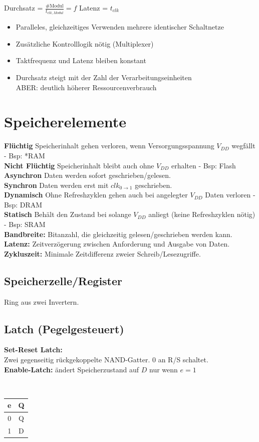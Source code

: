 \documentclass[6pt,a4paper]{scrartcl}
\renewcommand{\emph}[1]{\textsf{\textbf{#1}}}
\newcommand{\ra}[0]{\ensuremath{\rightarrow}} 									%
\begin{document}
\begin{multicols*}{3}
	Durchsatz = $\frac{\#\text{Modul}}{t_{clk,Modul}} = f$ \qquad \quad Latenz = $t_{clk}$
	\begin{itemize} \itemsep0pt
		\item Paralleles, gleichzeitiges Verwenden mehrere identischer Schaltnetze
		\item Zusätzliche Kontrolllogik nötig (Multiplexer)
		\item Taktfrequenz und Latenz bleiben konstant
		\item Durchsatz steigt mit der Zahl der Verarbeitungseinheiten \\
		ABER: deutlich höherer Ressourcenverbrauch
	\end{itemize}


\section{Speicherelemente}
	\emph{Flüchtig} Speicherinhalt gehen verloren, wenn Versorgungsspannung $V_{DD}$ wegfällt - Bsp: *RAM\\
	\emph{Nicht Flüchtig} Speicherinhalt bleibt auch ohne $V_{DD}$ erhalten - Bsp: Flash\\
	\emph{Asynchron} Daten werden sofort geschrieben/gelesen.\\
	\emph{Synchron} Daten werden erst mit $clk_{0 \ra 1}$ geschrieben.\\
	\emph{Dynamisch} Ohne Refreshzyklen gehen auch bei angelegter $V_{DD}$ Daten verloren -  Bsp: DRAM\\
	\emph{Statisch} Behält den Zustand bei solange $V_{DD}$ anliegt (keine Refreshzyklen nötig) - Bsp: SRAM\\
	\emph{Bandbreite:} Bitanzahl, die gleichzeitig gelesen/geschrieben werden kann.
	\emph{Latenz:} Zeitverzögerung zwischen Anforderung und Ausgabe von Daten.
	\emph{Zykluszeit:} Minimale Zeitdifferenz zweier Schreib/Lesezugriffe.
	

	\subsection{Speicherzelle/Register}
	Ring aus zwei Invertern.
	
	\subsection{Latch (Pegelgesteuert)}
	\parbox{5cm}{
		\emph{Set-Reset Latch:} \\ Zwei gegenseitig rückgekoppelte NAND-Gatter. $0$ an R/S schaltet.
		\\	\emph{Enable-Latch:} ändert Speicherzustand auf $D$ nur wenn $e=1$
	}
	\parbox{.5cm}{\ }
	\parbox{2cm}{
		\begin{tabular}{c|c} e & Q \\ \hline 0 & Q \\ 1 & D \end{tabular}
	}
	


\end{multicols*}
\end{document}
